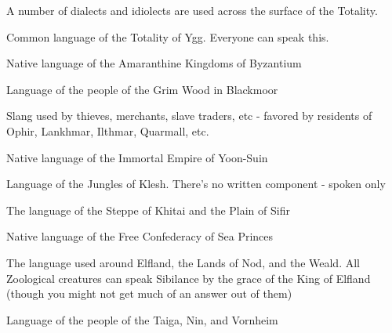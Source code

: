 {  \begin{multicols}{2}




  A number of dialects and idiolects are used across the surface of the Totality.
  


  Common language of the Totality of Ygg.  Everyone can speak this.


  Native language of the Amaranthine Kingdoms of Byzantium


  Language of the people of the Grim Wood in Blackmoor



  Slang used by thieves, merchants, slave traders, etc - favored by residents of Ophir, Lankhmar, Ilthmar, Quarmall, etc.


  Native language of the Immortal Empire of Yoon-Suin


  Language of the Jungles of Klesh. There's no written component - spoken only


  The language of the Steppe of Khitai and the Plain of Sifir


  Native language of the Free Confederacy of Sea Princes


  The language used around Elfland, the Lands of Nod, and the Weald.  All Zoological creatures can speak Sibilance by the grace of the King of Elfland (though you might not get much of an answer out of them)


  Language of the people of the Taiga, Nin, and Vornheim





\end{multicols}}
